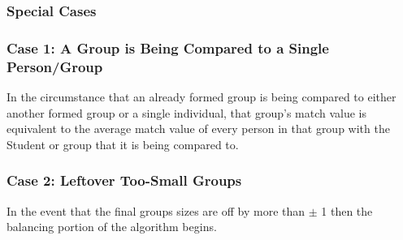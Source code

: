 \documentclass[12pt,letterpaper]{article}
\begin{document}
\subsubsection{Special Cases}
\subsubsection*{Case 1: A Group is Being Compared to a Single Person/Group}
In the circumstance that an already formed group is being compared to either another formed group or a single individual, that group's match value is equivalent to the average match value of every person in that group with the Student or group that it is being compared to. 
\subsubsection*{Case 2: Leftover Too-Small Groups}
In the event that the final groups sizes are off by more than $\pm$ 1 then the balancing portion of the algorithm begins.
\vspace{1em}
\end{document}
